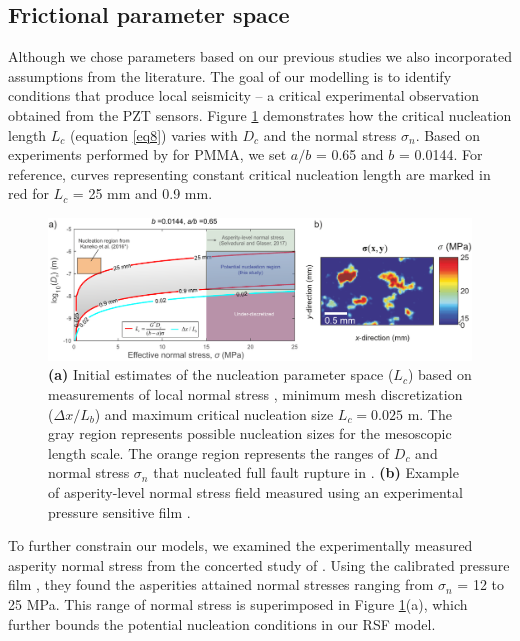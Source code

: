 \documentclass[preprint,1p, 10pt,authoryear]{elsarticle}
\begin{document}
\subsection{Frictional parameter space}
\label{ParameterSpace}
Although we chose parameters based on our previous studies we also incorporated assumptions from the literature. The goal of our modelling is to identify conditions that produce local seismicity -- a critical experimental observation obtained from the PZT sensors. Figure \ref{fig4} demonstrates how the critical nucleation length $L_{c}$ (equation \eqref{eq8}) varies with $D_{c}$ and the normal stress $\sigma_{n}$.  Based on experiments performed by \citet{Berthoude1999} for PMMA, we set $a/b$ = 0.65 and $b$ = 0.0144. For reference, curves representing constant critical nucleation length are marked in red for $L_{c}$ = 25 mm and 0.9 mm.   

\begin{figure}
	\centering
	\includegraphics[scale = 0.95]{FIG4.pdf} 
	\caption{\textbf{(a) }Initial estimates of the nucleation parameter space ($L_{c}$) based on measurements of local normal stress \citep{Selvadurai2017}, minimum mesh discretization ($\Delta x /L_{b}$) and maximum critical nucleation size $L_{c} = 0.025$ m. The gray region represents possible nucleation sizes for the mesoscopic length scale.  The orange region represents the ranges of $D_{c}$ and normal stress $\sigma_{n}$ that nucleated full fault rupture in \citet[][, *$a/b$ = 0.6944]{Kaneko2016}. \textbf{(b) }Example of asperity-level normal stress field measured using an experimental pressure sensitive film \citep[adapted from ][]{Selvadurai2017}.}
	\label{fig4}
\end{figure}

To further constrain our models, we examined the experimentally measured asperity normal stress from the concerted study of \citet{Selvadurai2017}. Using the calibrated pressure film \citep{Selvadurai2015a}, they found the asperities attained normal stresses ranging from $\sigma_{n}$ = 12 to 25 MPa. This range of normal stress is superimposed in Figure \ref{fig4}(a), which further bounds the potential nucleation conditions in our RSF model.
\end{document}
